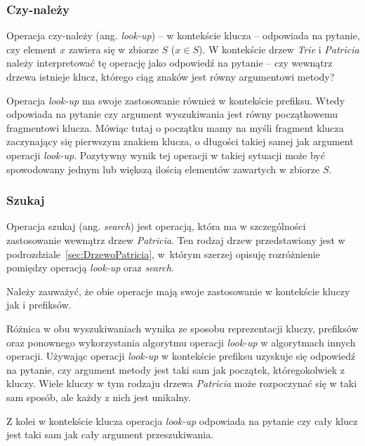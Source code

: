		\subsubsection{Czy-należy}\label{sec:czescTeoretycznaPrzegladDrzewTrieOperacjeLookUpCzyZawiera}
		
        Operacja czy-należy (ang. \emph{look-up}) -- w kontekście klucza -- odpowiada na pytanie, czy element $x$ zawiera się w zbiorze $S$ ($x \in S$). W kontekście drzew \emph{Trie} i \emph{Patricia} należy interpretować tę operację jako odpowiedź na pytanie -- czy wewnątrz drzewa istnieje klucz, którego ciąg znaków jest równy argumentowi metody?
        
        Operacja \emph{look-up} ma swoje zastosowanie również w kontekście prefiksu. Wtedy odpowiada na pytanie czy argument wyszukiwania jest równy początkowemu fragmentowi klucza. Mówiąc tutaj o początku mamy na myśli fragment klucza zaczynający się pierwszym znakiem klucza, o długości takiej samej jak argument operacji \emph{look-up}. Pozytywny wynik tej operacji w takiej sytuacji może być spowodowany jednym lub większą ilością elementów zawartych w zbiorze $S$.
		
		\subsubsection{Szukaj}\label{sec:czescTeoretycznaPrzegladDrzewTrieOperacjeSearchSzukaj}
		
		Operacja szukaj (ang. \emph{search}) jest operacją, która ma w szczególności zastosowanie wewnątrz drzew \emph{Patricia}. Ten rodzaj drzew przedstawiony jest w podrozdziale~\ref{sec:DrzewoPatricia}, w~którym szerzej opisuję rozróżnienie pomiędzy operacją \emph{look-up} oraz \emph{search}. 
		
		Należy zauważyć, że obie operacje mają swoje zastosowanie w kontekście kluczy jak i prefiksów.
		
		Różnica w obu wyszukiwaniach wynika ze sposobu reprezentacji kluczy, prefiksów oraz ponownego wykorzystania algorytmu operacji \emph{look-up} w algorytmach innych operacji. Używając operacji \emph{look-up} w kontekście prefiksu uzyskuje się odpowiedź na pytanie, czy argument metody jest taki sam jak początek, któregokolwiek z kluczy. Wiele kluczy w tym rodzaju drzewa \emph{Patricia} może rozpoczynać się w taki sam sposób, ale każdy z nich jest unikalny. 
		
		Z kolei w kontekście klucza operacja \emph{look-up} odpowiada na pytanie czy cały klucz jest taki sam jak cały argument przeszukiwania.
		
